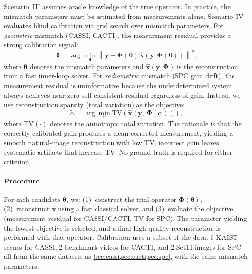 \documentclass[runningheads]{llncs}
\begin{document}
Scenario~III assumes oracle knowledge of the true operator.
In practice, the mismatch parameters must be estimated from measurements alone.
Scenario~IV evaluates blind calibration via grid search over mismatch parameters.
For \emph{geometric} mismatch (CASSI, CACTI), the measurement residual provides a strong calibration signal:
\begin{equation}
    \tilde{\boldsymbol{\theta}} = \arg\min_{\boldsymbol{\theta}} \left\| \mathbf{y} - \mathbf{\Phi}(\boldsymbol{\theta})\, \hat{\mathbf{x}}\!\left(\mathbf{y}, \mathbf{\Phi}(\boldsymbol{\theta})\right) \right\|^2,
    \label{eq:scenario_iv}
\end{equation}
where $\boldsymbol{\theta}$ denotes the mismatch parameters and $\hat{\mathbf{x}}(\mathbf{y}, \mathbf{\Phi})$ is the reconstruction from a fast inner-loop solver.
For \emph{radiometric} mismatch (SPC gain drift), the measurement residual is uninformative because the underdetermined system always achieves near-zero self-consistent residual regardless of gain.
Instead, we use reconstruction sparsity (total variation) as the objective:
\begin{equation}
    \tilde{\alpha} = \arg\min_{\alpha} \mathrm{TV}\!\left(\hat{\mathbf{x}}\!\left(\mathbf{y},\, \mathbf{\Phi}(\alpha)\right)\right),
    \label{eq:scenario_iv_tv}
\end{equation}
where $\mathrm{TV}(\cdot)$ denotes the anisotropic total variation.
The rationale is that the correctly calibrated gain produces a clean corrected measurement, yielding a smooth natural-image reconstruction with low TV; incorrect gain leaves systematic artifacts that increase TV.
No ground truth is required for either criterion.

\paragraph{Procedure.}
For each candidate $\boldsymbol{\theta}$, we: (1)~construct the trial operator $\mathbf{\Phi}(\boldsymbol{\theta})$, (2)~reconstruct $\hat{\mathbf{x}}$ using a fast classical solver, and (3)~evaluate the objective (measurement residual for CASSI/CACTI, TV for SPC).
The parameter yielding the lowest objective is selected, and a final high-quality reconstruction is performed with that operator.
Calibration uses a subset of the data: 3 KAIST scenes for CASSI, 2 benchmark videos for CACTI, and 2 Set11 images for SPC---all from the same datasets as \cref{sec:cassi,sec:cacti,sec:spc}, with the same mismatch parameters.
\end{document}
